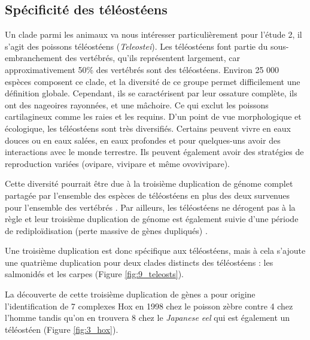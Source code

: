 \subsection{Spécificité des téléostéens}\label{teleost}
\par Un clade parmi les animaux va nous intéresser particulièrement pour l’étude 2, il s’agit des poissons téléostéens (\textit{Teleostei}). Les téléostéens font partie du sous-embranchement des vertébrés, qu'ils représentent largement, car approximativement 50\% des vertébrés sont des téléostéens. Environ 25 000 espèces composent ce clade, et la diversité de ce groupe permet difficilement une définition globale. Cependant, ils se caractérisent par leur ossature complète, ils ont des nageoires rayonnées, et une mâchoire. Ce qui exclut les poissons cartilagineux comme les raies et les requins. D’un point de vue morphologique et écologique, les téléostéens sont très diversifiés. Certains peuvent vivre en eaux douces ou en eaux salées, en eaux profondes et pour quelques-uns avoir des interactions avec le monde terrestre. Ils peuvent également avoir des stratégies de reproduction variées (ovipare, vivipare et même ovovivipare). 
\par Cette diversité pourrait être due à la troisième duplication de génome complet partagée par l’ensemble des espèces de téléostéens en plus des deux survenues pour l’ensemble des vertébrés \parencite{ravi_rapidly_2008, taylor_genome_2003}. Par ailleurs, les téléostéens ne dérogent pas à la règle et leur troisième duplication de génome est également suivie d’une période de rediploïdisation (perte massive de gènes dupliqués) \parencite{inoue_rapid_2015}. 
\par Une troisième duplication est donc spécifique aux téléostéens, mais à cela s’ajoute une quatrième duplication pour deux clades distincts des téléostéens : les salmonidés et les carpes \parencite{jaillon_genome_2004, lien_atlantic_2016}  (Figure \ref{fig:9_teleosts}).
\par La découverte de cette troisième duplication de gènes a pour origine l’identification de 7 complexes Hox en 1998 chez le poisson zèbre contre 4 chez l’homme \parencite{amores_zebrafish_1998} tandis qu’on en trouvera 8 chez le \textit{Japanese eel} qui est également un téléostéen \parencite{guo_hox_2010} (Figure \ref{fig:3_hox}). \newpage

